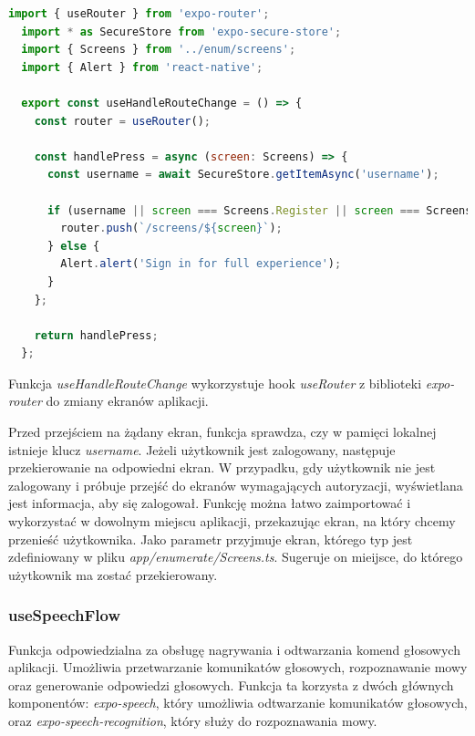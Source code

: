 \begin{lstlisting}[language=JavaScript, caption=useHandleRouteChangeHook, label=lst:hook]
  import { useRouter } from 'expo-router';
  import * as SecureStore from 'expo-secure-store';
  import { Screens } from '../enum/screens';
  import { Alert } from 'react-native';

  export const useHandleRouteChange = () => {
    const router = useRouter();

    const handlePress = async (screen: Screens) => {
      const username = await SecureStore.getItemAsync('username');

      if (username || screen === Screens.Register || screen === Screens.Login) {
        router.push(`/screens/${screen}`);
      } else {
        Alert.alert('Sign in for full experience');
      }
    };

    return handlePress;
  };
\end{lstlisting}
      
Funkcja \textit{useHandleRouteChange} wykorzystuje hook \textit{useRouter} z biblioteki \textit{expo-router} do zmiany ekranów aplikacji. 

Przed przejściem na żądany ekran, funkcja sprawdza, czy w pamięci lokalnej istnieje klucz \textit{username}. Jeżeli użytkownik jest zalogowany, następuje przekierowanie na odpowiedni ekran. W przypadku, gdy użytkownik nie jest zalogowany i próbuje przejść do ekranów wymagających autoryzacji, wyświetlana jest informacja, aby się zalogował. Funkcję można łatwo zaimportować i wykorzystać w dowolnym miejscu aplikacji, przekazując ekran, na który chcemy przenieść użytkownika. Jako parametr przyjmuje ekran, którego typ jest zdefiniowany w pliku \textit{app/enumerate/Screens.ts}. Sugeruje on mieijsce, do którego użytkownik ma zostać przekierowany.

\subsubsection{useSpeechFlow} 

Funkcja odpowiedzialna za obsługę nagrywania i odtwarzania komend głosowych aplikacji. Umożliwia przetwarzanie komunikatów głosowych, rozpoznawanie mowy oraz generowanie odpowiedzi głosowych. Funkcja ta korzysta z dwóch głównych komponentów: \textit{expo-speech}, który umożliwia odtwarzanie komunikatów głosowych, oraz \textit{expo-speech-recognition}, który służy do rozpoznawania mowy.


